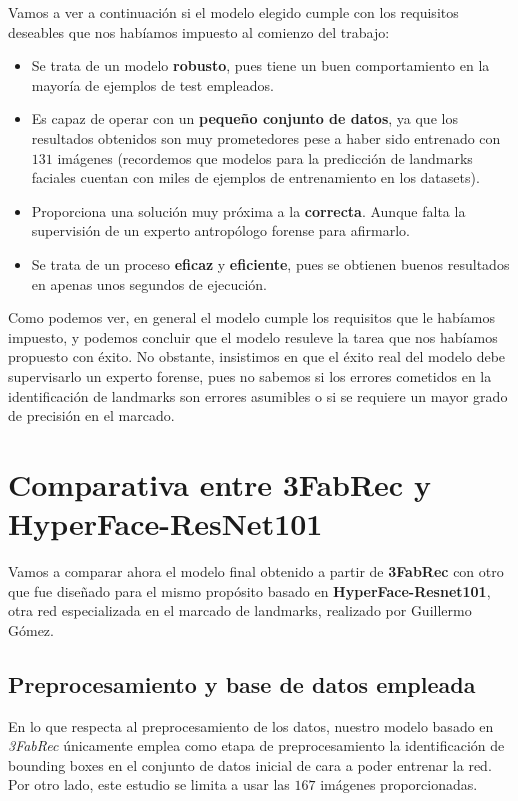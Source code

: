         \medskip

        \noindent Vamos a ver a continuación si el modelo elegido cumple con los requisitos deseables que nos habíamos impuesto al comienzo del trabajo: 
        \begin{itemize}
            \item Se trata de un modelo \textbf{robusto}, pues tiene un buen comportamiento en la mayoría de ejemplos de test empleados.
            \item Es capaz de operar con un \textbf{pequeño conjunto de datos}, ya que los resultados obtenidos son muy prometedores pese a haber sido entrenado con $131$ imágenes (recordemos que modelos para la predicción de landmarks faciales cuentan con miles de ejemplos de entrenamiento en los datasets).
            \item Proporciona una solución muy próxima a la \textbf{correcta}. Aunque falta la supervisión de un experto antropólogo forense para afirmarlo.
            \item Se trata de un proceso \textbf{eficaz} y \textbf{eficiente}, pues se obtienen buenos resultados en apenas unos segundos de ejecución.
        \end{itemize}

        \medskip

        \noindent Como podemos ver, en general el modelo cumple los requisitos que le habíamos impuesto, y podemos concluir que el modelo resuleve la tarea que nos habíamos propuesto con éxito. No obstante, insistimos en que el éxito real del modelo debe supervisarlo un experto forense, pues no sabemos si los errores cometidos en la identificación de landmarks son errores asumibles o si se requiere un mayor grado de precisión en el marcado.

    \section{Comparativa entre 3FabRec y HyperFace-ResNet101}
        \noindent Vamos a comparar ahora el modelo final obtenido a partir de \textbf{3FabRec} con otro que fue diseñado para el mismo propósito basado en \textbf{HyperFace-Resnet101}, otra red especializada en el marcado de landmarks, realizado por Guillermo Gómez.

        \subsection{Preprocesamiento y base de datos empleada}
            \noindent En lo que respecta al preprocesamiento de los datos, nuestro modelo basado en \textit{3FabRec} únicamente emplea como etapa de preprocesamiento la identificación de bounding boxes en el conjunto de datos inicial de cara a poder entrenar la red. Por otro lado, este estudio se limita a usar las $167$ imágenes proporcionadas.

